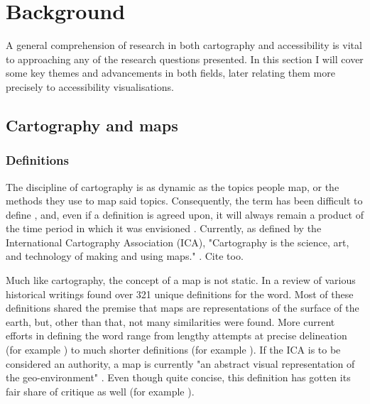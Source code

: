 \section{Background}
A general comprehension of research in both cartography and accessibility is
vital to approaching any of the research questions presented.
In this section I will cover some key themes and advancements in both fields, %
later relating them more precisely to accessibility visualisations.


\subsection{Cartography and maps}

\subsubsection{Definitions}

The discipline of cartography is as dynamic as the topics people map,
or the methods they use to map said topics.
Consequently, the term has been difficult to define \parencite{kry1995},
and, even if a definition is agreed upon,
it will always remain a product of the time period
in which it was envisioned \parencite{tyn1992, and1996}.
Currently, as defined by the International Cartography Association (ICA), "Cartography is
the science, art, and technology of making and using maps."
\parencite{ica2019}. Cite \parencite{kra2017} too.  %

Much like cartography, the concept of a map is not static.
In a review of various historical writings \textcite{and1996}
found over 321 unique definitions for the word.
Most of these definitions shared the premise that
maps are representations of the surface of the earth,
but, other than that, not many similarities were found.
More current efforts in defining the word range
from lengthy attempts at precise delineation (for example \textcite{ica2003, })
to much shorter definitions (for example \textcite{}).
If the ICA is to be considered an authority, a map is currently
"an abstract visual representation of the geo-environment" \parencite{ica2019}.
Even though quite concise, this definition has gotten its fair share of critique as well
(for example \textcite{lap2021}).


